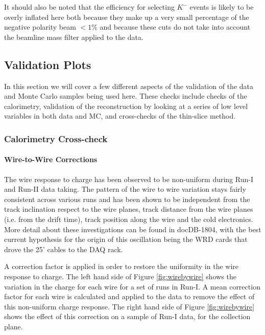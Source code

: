 It should also be noted that the efficiency for selecting $K^{-}$ events is likely to be overly inflated here both because they make up a very small percentage of the negative polarity beam $< 1\%$ and because these cuts do not take into account the beamline mass filter applied to the data.


\subsection{Validation Plots} \label{sec:ValidationPlots}
In this section we will cover a few different aspects of the validation of the data and Monte Carlo samples being used here. These checks include checks of the calorimetry, validation of the reconstruction by looking at a series of low level variables in both data and MC, and cross-checks of the thin-slice method.

\subsubsection{Calorimetry Cross-check} \label{sec:calocrosscheck}
\paragraph{\textbf{Wire-to-Wire Corrections}}

The wire response to charge has been observed to be non-uniform during Run-I and Run-II data taking. The pattern of the wire to wire variation stays fairly consistent across various runs and has been shown to be independent from the track inclination respect to the wire planes, track distance from the wire planes (i.e. from the drift time), track position along the wire and the cold electronics. More detail about these investigations can be found in docDB-1804, with the best current hypothesis for the origin of this oscillation being the WRD cards that drove the 25' cables to the DAQ rack.


A correction factor is applied in order to restore the uniformity in the wire response to charge. The left hand side of Figure \ref{fig:wirebywire} shows the variation in the charge for each wire for a set of runs in Run-I. A mean correction factor for each wire is calculated and applied to the data to remove the effect of this non-uniform charge response. The right hand side of Figure \ref{fig:wirebywire} shows the effect of this correction on a sample of Run-I data, for the collection plane.

